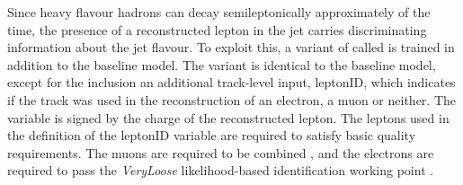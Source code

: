 Since heavy flavour hadrons can decay semileptonically approximately  of the time, the presence of a reconstructed lepton in the jet carries discriminating information about the jet flavour. 
To exploit this, a variant of \GNN called \GNNLep is trained in addition to the baseline model.
The \GNNLep variant is identical to the baseline model, except for the inclusion an additional track-level input, leptonID, which indicates if the track was used in the reconstruction of an electron, a muon or neither. 
The variable is signed by the charge of the reconstructed lepton.
The leptons used in the definition of the leptonID variable are required to satisfy basic quality requirements.
The muons are required to be combined \cite{ATL-PHYS-PUB-2015-037}, and the electrons are required to pass the \textit{VeryLoose} likelihood-based identification working point \cite{PERF-2017-01}.

